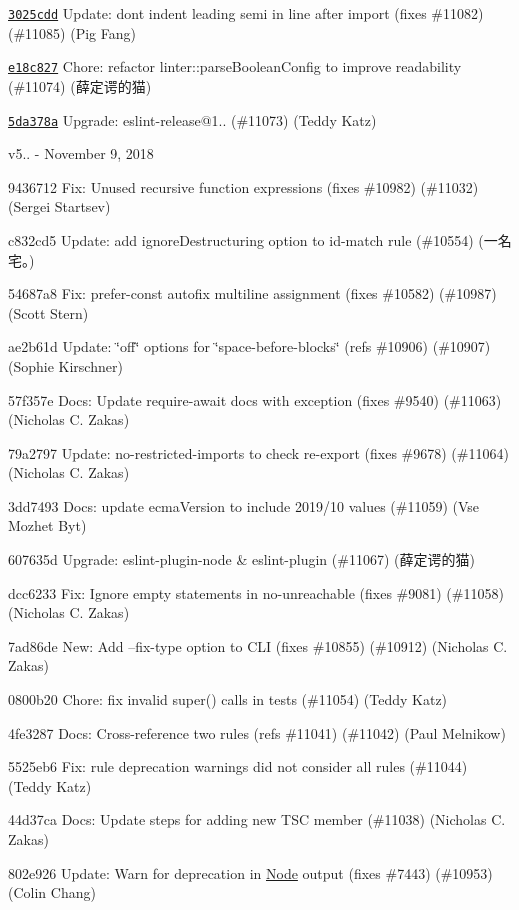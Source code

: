 \begin{DoxyItemize}
\item \href{https://github.com/eslint/eslint/commit/3025cddf0a2ea8461ce05575098a5714fcf6278d}{\texttt{ {\ttfamily 3025cdd}}} Update\+: don\textquotesingle{}t indent leading semi in line after import (fixes \#11082) (\#11085) (Pig Fang)
\item \href{https://github.com/eslint/eslint/commit/e18c827cc12cb1c52e5d0aa993f572cb56238704}{\texttt{ {\ttfamily e18c827}}} Chore\+: refactor linter\+::parse\+Boolean\+Config to improve readability (\#11074) (薛定谔的猫)
\item \href{https://github.com/eslint/eslint/commit/5da378ac922d732ca1765f08edee0face1b1b924}{\texttt{ {\ttfamily 5da378a}}} Upgrade\+: eslint-\/release@1.. (\#11073) (Teddy Katz)
\end{DoxyItemize}

v5.. -\/ November 9, 2018


\begin{DoxyItemize}
\item 9436712 Fix\+: Unused recursive function expressions (fixes \#10982) (\#11032) (Sergei Startsev)
\item c832cd5 Update\+: add {\ttfamily ignore\+Destructuring} option to {\ttfamily id-\/match} rule (\#10554) (一名宅。)
\item 54687a8 Fix\+: prefer-\/const autofix multiline assignment (fixes \#10582) (\#10987) (Scott Stern)
\item ae2b61d Update\+: \char`\"{}off\char`\"{} options for \char`\"{}space-\/before-\/blocks\char`\"{} (refs \#10906) (\#10907) (Sophie Kirschner)
\item 57f357e Docs\+: Update require-\/await docs with exception (fixes \#9540) (\#11063) (Nicholas C. Zakas)
\item 79a2797 Update\+: no-\/restricted-\/imports to check re-\/export (fixes \#9678) (\#11064) (Nicholas C. Zakas)
\item 3dd7493 Docs\+: update ecma\+Version to include 2019/10 values (\#11059) (Vse Mozhet Byt)
\item 607635d Upgrade\+: eslint-\/plugin-\/node \& eslint-\/plugin (\#11067) (薛定谔的猫)
\item dcc6233 Fix\+: Ignore empty statements in no-\/unreachable (fixes \#9081) (\#11058) (Nicholas C. Zakas)
\item 7ad86de New\+: Add --fix-\/type option to C\+LI (fixes \#10855) (\#10912) (Nicholas C. Zakas)
\item 0800b20 Chore\+: fix invalid super() calls in tests (\#11054) (Teddy Katz)
\item 4fe3287 Docs\+: Cross-\/reference two rules (refs \#11041) (\#11042) (Paul Melnikow)
\item 5525eb6 Fix\+: rule deprecation warnings did not consider all rules (\#11044) (Teddy Katz)
\item 44d37ca Docs\+: Update steps for adding new T\+SC member (\#11038) (Nicholas C. Zakas)
\item 802e926 Update\+: Warn for deprecation in \mbox{\hyperlink{class_node}{Node}} output (fixes \#7443) (\#10953) (Colin Chang)
\end{DoxyItemize}

